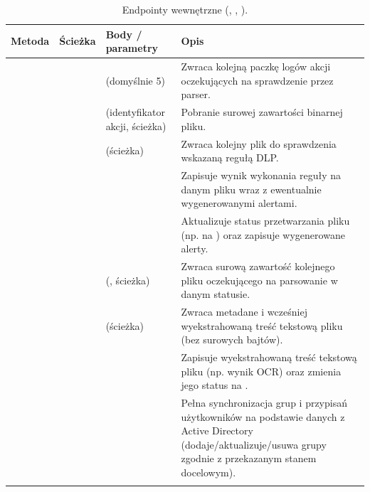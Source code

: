 \begingroup\footnotesize
\begin{longtable}{M{1.4cm} M{4.6cm} M{4.5cm} M{4.0cm}}
\toprule
{}
\textbf{Metoda} & \textbf{Ścieżka} & \textbf{Body / parametry} & \textbf{Opis} \\
\midrule
\endhead
{} &  &  (domyślnie 5) &
  Zwraca kolejną paczkę logów akcji oczekujących na sprawdzenie przez parser. \\
 &  &  (identyfikator akcji, ścieżka) &
  Pobranie surowej zawartości binarnej pliku. \\
 &  &  (ścieżka) &
  Zwraca kolejny plik do sprawdzenia wskazaną regułą DLP. \\
 &  &  &
  Zapisuje wynik wykonania reguły na danym pliku wraz z ewentualnie wygenerowanymi alertami. \\
 &  &  &
  Aktualizuje status przetwarzania pliku (np. na ) oraz zapisuje wygenerowane alerty. \\
 &  &  (, ścieżka) &
  Zwraca surową zawartość kolejnego pliku oczekującego na parsowanie w danym statusie. \\
 &  &  (ścieżka) &
  Zwraca metadane i wcześniej wyekstrahowaną treść tekstową pliku (bez surowych bajtów). \\
 &  &  &
  Zapisuje wyekstrahowaną treść tekstową pliku (np. wynik OCR) oraz zmienia jego status na
  . \\
 &  &  &
  Pełna synchronizacja grup i przypisań użytkowników na podstawie danych z Active Directory
  (dodaje/aktualizuje/usuwa grupy zgodnie z przekazanym stanem docelowym). \\
\bottomrule
\caption{Endpointy wewnętrzne (, , ).}
\end{longtable}
\endgroup

